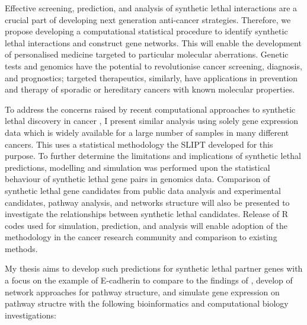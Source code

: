 Effective screening, prediction, and analysis of \gls{synthetic lethal} interactions are a crucial part of developing next generation anti-cancer strategies. Therefore, we propose developing a computational statistical procedure to identify \gls{synthetic lethal} interactions and construct gene networks. This will enable the development of personalised medicine targeted to particular molecular aberrations. Genetic tests and \gls{genomics} have the potential to revolutionise cancer screening, diagnosis, and prognostics; targeted therapeutics, similarly, have applications in prevention and therapy of sporadic or hereditary cancers with known molecular properties.

To address the concerns raised by recent computational approaches to \gls{synthetic lethal} discovery in cancer \citep{Jerby2014, Lu2015, Wappett2016}, I present similar analysis using solely gene expression data which is widely available for a large number of samples in many different cancers. This uses a statistical methodology the \gls{SLIPT} developed for this purpose. To further determine the limitations and implications of \gls{synthetic lethal} predictions, modelling and simulation was performed upon the statistical behaviour of \gls{synthetic lethal} gene pairs in \gls{genomics} data. Comparison of \gls{synthetic lethal} gene candidates from public data analysis and experimental candidates, pathway analysis, and networks structure will also be presented to investigate the relationships between \gls{synthetic lethal} candidates. Release of R codes used for simulation, prediction, and analysis will enable adoption of the methodology in the cancer research community and comparison to existing methods. 

My thesis aims to develop such predictions for \gls{synthetic lethal} partner genes with a focus on the example of \gls{E-cadherin} to compare to the findings of \citet{Telford2015}, develop of network approaches for pathway structure, and simulate gene expression on pathway structre with the following \gls{bioinformatics} and computational biology investigations:

